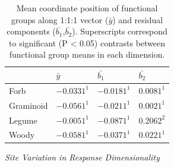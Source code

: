 \documentclass[twoside,12pt,final]{ucthesis-CA2012}
\begin{document}
\begin{ucmainmatter}
\begin{figure}
\end{figure}
\begin{table}[ht]
\centering
\begin{tabular}{llll}
  \hline
 & $\bar{y}$ & $\bar{b_1}$ & $\bar{b_2}$ \\ 
  \hline
Forb & $-0.0331^1$ & $-0.0181^1$ & $0.0081^1$ \\ 
  Graminoid & $-0.0561^1$ & $-0.0211^1$ & $0.0021^1$ \\ 
  Legume & $-0.0051^1$ & $-0.0871^1$ & $0.2062^2$ \\ 
  Woody & $-0.0581^1$ & $-0.0371^1$ & $0.0221^1$ \\ 
   \hline
\end{tabular}
\caption{Mean coordinate position of functional groups along 1:1:1 vector ($\bar{y}$) and residual components ($\bar{b_1}$,$\bar{b_2}$). Superscripts correspond to significant (P < 0.05) contrasts between functional group means in each dimension.} 
\end{table}
\emph{Site Variation in Response Dimensionality}


\end{ucmainmatter}
\end{document}
